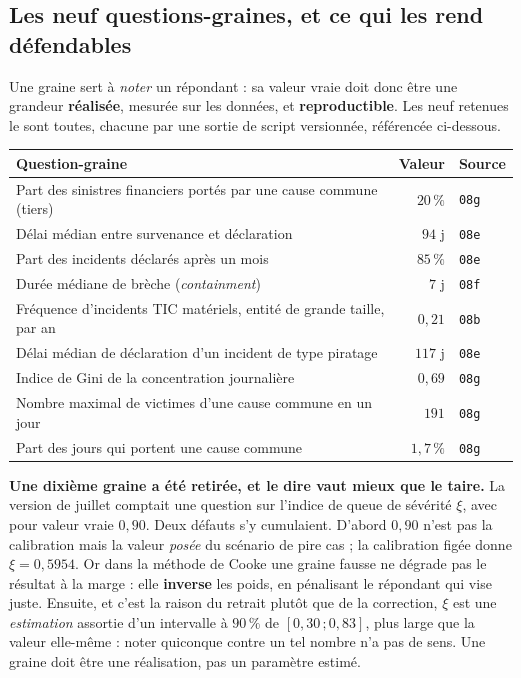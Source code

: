 \documentclass[11pt,a4paper]{article}
\begin{document}
\subsection*{Les neuf questions-graines, et ce qui les rend défendables}

Une graine sert à \emph{noter} un répondant : sa valeur vraie doit donc être une grandeur
\textbf{réalisée}, mesurée sur les données, et \textbf{reproductible}. Les neuf retenues le sont
toutes, chacune par une sortie de script versionnée, référencée ci-dessous.

\begin{center}\footnotesize
\renewcommand{\arraystretch}{1.12}
\begin{tabular}{@{}p{10.4cm} r l@{}}
\toprule
\textbf{Question-graine} & \textbf{Valeur} & \textbf{Source} \\
\midrule
Part des sinistres financiers portés par une cause commune (tiers) & $20\,\%$ & \texttt{08g} \\
Délai médian entre survenance et déclaration & $94$ j & \texttt{08e} \\
Part des incidents déclarés après un mois & $85\,\%$ & \texttt{08e} \\
Durée médiane de brèche (\emph{containment}) & $7$ j & \texttt{08f} \\
Fréquence d'incidents TIC matériels, entité de grande taille, par an & $0{,}21$ & \texttt{08b} \\
Délai médian de déclaration d'un incident de type piratage & $117$ j & \texttt{08e} \\
Indice de Gini de la concentration journalière & $0{,}69$ & \texttt{08g} \\
Nombre maximal de victimes d'une cause commune en un jour & $191$ & \texttt{08g} \\
Part des jours qui portent une cause commune & $1{,}7\,\%$ & \texttt{08g} \\
\bottomrule
\end{tabular}
\end{center}

\vspace{4pt}
\begin{garde}
\textbf{Une dixième graine a été retirée, et le dire vaut mieux que le taire.} La version de
juillet comptait une question sur l'indice de queue de sévérité $\xi$, avec pour valeur vraie
$0{,}90$. Deux défauts s'y cumulaient. D'abord $0{,}90$ n'est pas la calibration mais la valeur
\emph{posée} du scénario de pire cas ; la calibration figée donne $\xi=0{,}5954$. Or dans la
méthode de Cooke une graine fausse ne dégrade pas le résultat à la marge : elle \textbf{inverse}
les poids, en pénalisant le répondant qui vise juste. Ensuite, et c'est la raison du retrait
plutôt que de la correction, $\xi$ est une \emph{estimation} assortie d'un intervalle à $90\,\%$
de $[0{,}30\,;0{,}83]$, plus large que la valeur elle-même : noter quiconque contre un tel nombre
n'a pas de sens. Une graine doit être une réalisation, pas un paramètre estimé.
\end{garde}
\end{document}
